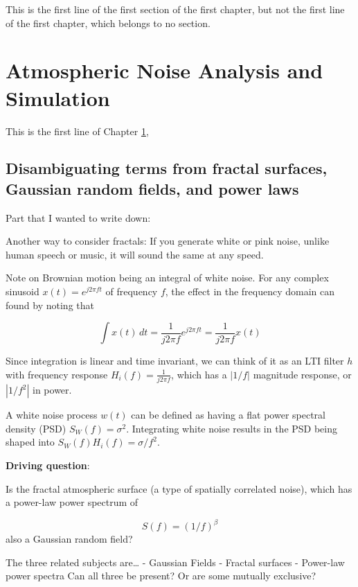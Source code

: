 \documentclass{utexasthesis}
\begin{document}
This is the first line of the first section of the first chapter, but not the first line of the first chapter, which belongs to no section.


\chapter{Atmospheric Noise Analysis and Simulation}
\label{chap:atmo-noise}

This is the first line of Chapter \ref{chap:atmo-noise}, 

\section{Disambiguating terms from fractal surfaces, Gaussian random
fields, and power
laws}
\label{disambiguating-terms-from-fractal-surfaces-gaussian-random-fields-and-power-laws}

Part that I wanted to write down:

Another way to consider fractals: If you generate white or pink noise, unlike human speech or music, it will sound the same at any speed.

Note on Brownian motion being an integral of white noise.
For any complex sinusoid $x(t) = e^{j2 \pi f t}$ of frequency $f$, the effect in the frequency domain can found by noting that 

\begin{equation}
\int x(t) \, dt = \frac{1}{j 2 \pi f} e^{j2\pi f t} = \frac{1}{j 2 \pi f} x(t)
\end{equation}

Since integration is linear and time invariant, we can think of it as an LTI filter $h$ with frequency response $H_i(f) = \frac{1}{j 2 \pi f} $, which has a $|1/f|$ magnitude response, or $|1/f^2|$ in power.

A white noise process $w(t)$ can be defined as having a flat power spectral density (PSD) $S_W(f) = \sigma^2$. Integrating white noise results in the PSD being shaped into $S_W(f) H_i(f) = \sigma / f^2$.

\textbf{Driving question}:

Is the fractal atmospheric surface (a type of spatially correlated
noise), which has a power-law power spectrum of

\[S(f) = (1/f)^{\beta}\] also a Gaussian random field?

The three related subjects are\ldots{} - Gaussian Fields - Fractal
surfaces - Power-law power spectra Can all three be present? Or are some
mutually exclusive?
\end{document}
